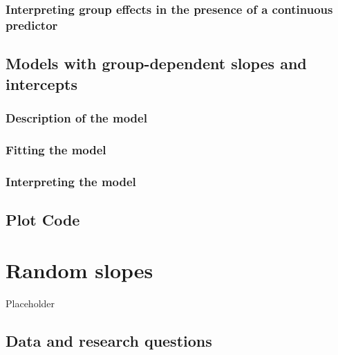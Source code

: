 \documentclass[
]{book}
\begin{document}
\hypertarget{interpreting-group-effects-in-the-presence-of-a-continuous-predictor}{%
\subsection{Interpreting group effects in the presence of a continuous predictor}\label{interpreting-group-effects-in-the-presence-of-a-continuous-predictor}}

\hypertarget{models-with-group-dependent-slopes-and-intercepts}{%
\section{Models with group-dependent slopes and intercepts}\label{models-with-group-dependent-slopes-and-intercepts}}

\hypertarget{description-of-the-model-6}{%
\subsection{Description of the model}\label{description-of-the-model-6}}

\hypertarget{fitting-the-model-5}{%
\subsection{Fitting the model}\label{fitting-the-model-5}}

\hypertarget{interpreting-the-model-3}{%
\subsection{Interpreting the model}\label{interpreting-the-model-3}}

\hypertarget{plot-code-4}{%
\section{Plot Code}\label{plot-code-4}}

\hypertarget{random-slopes}{%
\chapter{Random slopes}\label{random-slopes}}

Placeholder

\hypertarget{data-and-research-questions-5}{%
\section{Data and research questions}\label{data-and-research-questions-5}}
\end{document}
